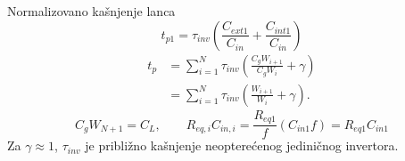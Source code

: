 \begin{frame}[label=09_3-s037]{Normalizovano kašnjenje lanca}
\[t_{p1}=\tau_{inv}\left(\frac{C_{ext1}}{C_{in}}+\frac{C_{int1}}{C_{in}}\right)\]
\[\begin{aligned}
t_p&=\sum_{i=1}^N\tau_{inv}\left(\frac{C_gW_{i+1}}{C_gW_i}+\gamma\right)\\
&=\sum_{i=1}^N\tau_{inv}\left(\frac{W_{i+1}}{W_i}+\gamma\right).
\end{aligned}\]
\[C_gW_{N+1}=C_L,\qquad
R_{eq,i}C_{in,i}=\frac{R_{eq1}}f(C_{in1}f)=R_{eq1}C_{in1}\]
Za $\gamma\approx1$, $\tau_{inv}$ je približno kašnjenje neopterećenog jediničnog invertora.
\end{frame}

